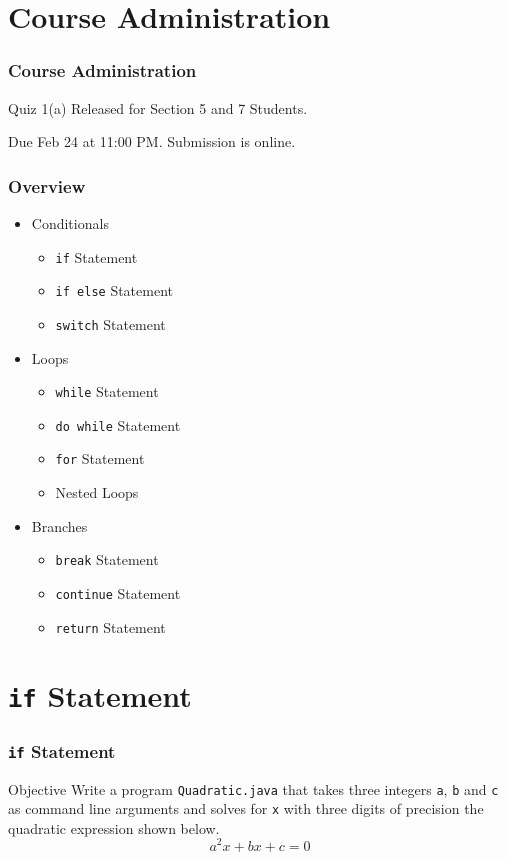\documentclass[10pt, compress]{beamer}
\begin{document}
\prepareCover

\section{Course Administration}

\begin{frame}[fragile]
\frametitle{Course Administration}
	Quiz 1(a) Released for Section 5 and 7 Students.

	Due Feb 24 at 11:00 PM. Submission is online.
\end{frame}

\begin{frame}[fragile]
	\frametitle{Overview}
	\begin{itemize}
		\item[] Conditionals
			\begin{itemize}
				\item[] \texttt{if} Statement
				\item[] \texttt{if else} Statement
				\item[] \texttt{switch} Statement
			\end{itemize}
		\item[] Loops
			\begin{itemize}
				\item[] \texttt{while} Statement
				\item[] \texttt{do while} Statement
				\item[] \texttt{for} Statement
				\item[] Nested Loops
			\end{itemize}
		\item[] Branches
			\begin{itemize}
				\item[] \texttt{break} Statement
				\item[] \texttt{continue} Statement
				\item[] \texttt{return} Statement
			\end{itemize}
	\end{itemize}
\end{frame}


\section{\texttt{if} Statement}

\begin{frame}[fragile]
	\frametitle{\texttt{if} Statement}
	\begin{block}{Objective}
		Write a program \texttt{Quadratic.java} that takes three integers \texttt{a}, \texttt{b} and \texttt{c} as command line arguments and solves for \texttt{x} with three digits of precision the quadratic expression shown below.
		\begin{equation*}\label{eq1}
			a^2 x + b x + c = 0
		\end{equation*}
	\end{block}
\end{frame}
\end{document}
